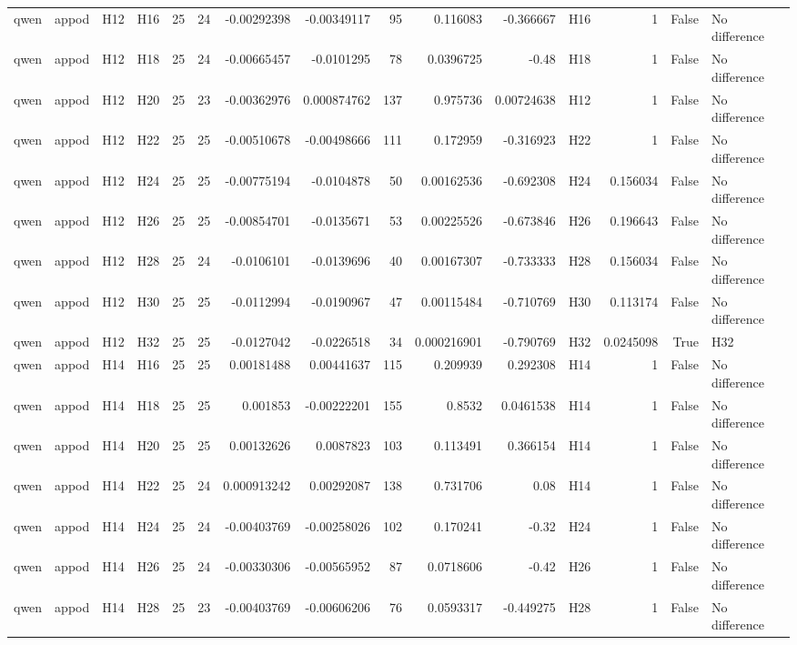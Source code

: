 \begin{longtable}{llllrrrrrrrlrrl}
qwen & appod & H12 & H16 & 25 & 24 & -0.00292398 & -0.00349117 & 95 & 0.116083 & -0.366667 & H16 & 1 & False & No difference \\
qwen & appod & H12 & H18 & 25 & 24 & -0.00665457 & -0.0101295 & 78 & 0.0396725 & -0.48 & H18 & 1 & False & No difference \\
qwen & appod & H12 & H20 & 25 & 23 & -0.00362976 & 0.000874762 & 137 & 0.975736 & 0.00724638 & H12 & 1 & False & No difference \\
qwen & appod & H12 & H22 & 25 & 25 & -0.00510678 & -0.00498666 & 111 & 0.172959 & -0.316923 & H22 & 1 & False & No difference \\
qwen & appod & H12 & H24 & 25 & 25 & -0.00775194 & -0.0104878 & 50 & 0.00162536 & -0.692308 & H24 & 0.156034 & False & No difference \\
qwen & appod & H12 & H26 & 25 & 25 & -0.00854701 & -0.0135671 & 53 & 0.00225526 & -0.673846 & H26 & 0.196643 & False & No difference \\
qwen & appod & H12 & H28 & 25 & 24 & -0.0106101 & -0.0139696 & 40 & 0.00167307 & -0.733333 & H28 & 0.156034 & False & No difference \\
qwen & appod & H12 & H30 & 25 & 25 & -0.0112994 & -0.0190967 & 47 & 0.00115484 & -0.710769 & H30 & 0.113174 & False & No difference \\
qwen & appod & H12 & H32 & 25 & 25 & -0.0127042 & -0.0226518 & 34 & 0.000216901 & -0.790769 & H32 & 0.0245098 & True & H32 \\
qwen & appod & H14 & H16 & 25 & 25 & 0.00181488 & 0.00441637 & 115 & 0.209939 & 0.292308 & H14 & 1 & False & No difference \\
qwen & appod & H14 & H18 & 25 & 25 & 0.001853 & -0.00222201 & 155 & 0.8532 & 0.0461538 & H14 & 1 & False & No difference \\
qwen & appod & H14 & H20 & 25 & 25 & 0.00132626 & 0.0087823 & 103 & 0.113491 & 0.366154 & H14 & 1 & False & No difference \\
qwen & appod & H14 & H22 & 25 & 24 & 0.000913242 & 0.00292087 & 138 & 0.731706 & 0.08 & H14 & 1 & False & No difference \\
qwen & appod & H14 & H24 & 25 & 24 & -0.00403769 & -0.00258026 & 102 & 0.170241 & -0.32 & H24 & 1 & False & No difference \\
qwen & appod & H14 & H26 & 25 & 24 & -0.00330306 & -0.00565952 & 87 & 0.0718606 & -0.42 & H26 & 1 & False & No difference \\
qwen & appod & H14 & H28 & 25 & 23 & -0.00403769 & -0.00606206 & 76 & 0.0593317 & -0.449275 & H28 & 1 & False & No difference \\

\end{longtable}

